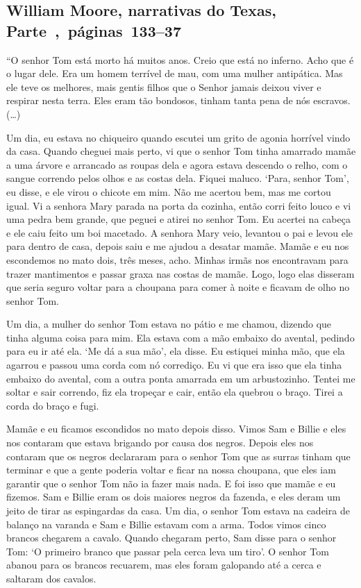 \subsection{William Moore, narrativas do Texas, Parte~,~páginas~133--37}
\label{ref198}

``O senhor Tom está morto há muitos anos. Creio que está no inferno.
Acho que é o lugar dele. Era um homem terrível de mau, com uma mulher
antipática. Mas ele teve os melhores, mais gentis filhos que o Senhor
jamais deixou viver e respirar nesta terra. Eles eram tão bondosos,
tinham tanta pena de nós escravos. (\ldots{})

Um dia, eu estava no chiqueiro quando escutei um grito de agonia
horrível vindo da casa. Quando cheguei mais perto, vi que o senhor Tom
tinha amarrado mamãe a uma árvore e arrancado as roupas dela e agora
estava descendo o relho, com o sangue correndo pelos olhos e as costas
dela. Fiquei maluco. `Para, senhor Tom', eu disse, e ele virou o chicote
em mim. Não me acertou bem, mas me cortou igual. Vi a senhora Mary
parada na porta da cozinha, então corri feito louco e vi uma pedra bem
grande, que peguei e atirei no senhor Tom. Eu acertei na cabeça e ele
caiu feito um boi macetado. A senhora Mary veio, levantou o pai e levou
ele para dentro de casa, depois saiu e me ajudou a desatar mamãe. Mamãe
e eu nos escondemos no mato dois, três meses, acho. Minhas irmãs nos
encontravam para trazer mantimentos e passar graxa nas costas de mamãe.
Logo, logo elas disseram que seria seguro voltar para a choupana para
comer à noite e ficavam de olho no senhor Tom.

Um dia, a mulher do senhor Tom estava no pátio e me chamou, dizendo que
tinha alguma coisa para mim. Ela estava com a mão embaixo do avental,
pedindo para eu ir até ela. `Me dá a sua mão', ela disse. Eu estiquei
minha mão, que ela agarrou e passou uma corda com nó corrediço. Eu vi
que era isso que ela tinha embaixo do avental, com a outra ponta
amarrada em um arbustozinho. Tentei me soltar e sair correndo, fiz ela
tropeçar e cair, então ela quebrou o braço. Tirei a corda do braço e
fugi.

Mamãe e eu ficamos escondidos no mato depois disso. Vimos Sam e Billie e
eles nos contaram que estava brigando por causa dos negros. Depois eles
nos contaram que os negros declararam para o senhor Tom que as surras
tinham que terminar e que a gente poderia voltar e ficar na nossa
choupana, que eles iam garantir que o senhor Tom não ia fazer mais nada.
E foi isso que mamãe e eu fizemos. Sam e Billie eram os dois maiores
negros da fazenda, e eles deram um jeito de tirar as espingardas da
casa. Um dia, o senhor Tom estava na cadeira de balanço na varanda e Sam
e Billie estavam com a arma. Todos vimos cinco brancos chegarem a
cavalo. Quando chegaram perto, Sam disse para o senhor Tom: `O primeiro
branco que passar pela cerca leva um tiro'. O senhor Tom abanou para os
brancos recuarem, mas eles foram galopando até a cerca e saltaram dos
cavalos.

